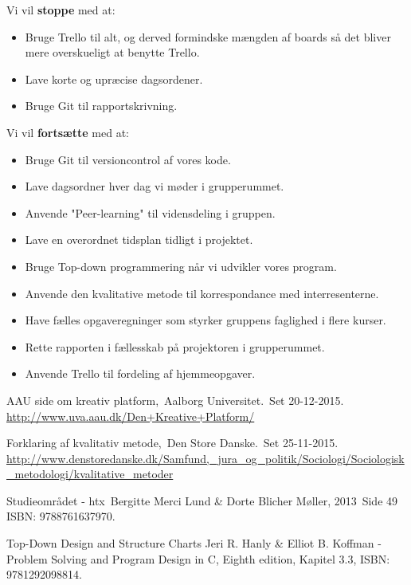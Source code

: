 \documentclass[oneside,a4paper,titlepage]{article}
\begin{document}
Vi vil \textbf{stoppe} med at:
\begin{itemize}
  \item Bruge Trello til alt, og derved formindske mængden af boards så det bliver mere overskueligt at benytte Trello.
  \item Lave korte og upræcise dagsordener.
  \item Bruge Git til rapportskrivning.
\end{itemize}

Vi vil \textbf{fortsætte} med at:
\begin{itemize}
  \item Bruge Git til versioncontrol af vores kode.
  \item Lave dagsordner hver dag vi møder i grupperummet.
  \item Anvende "Peer-learning" til vidensdeling i gruppen. 
  \item Lave en overordnet tidsplan tidligt i projektet. 
  \item Bruge Top-down programmering når vi udvikler vores program.
  \item Anvende den kvalitative metode til korrespondance med interresenterne. 
  \item Have fælles opgaveregninger som styrker gruppens faglighed i flere kurser.
  \item Rette rapporten i fællesskab på projektoren i grupperummet.
  \item Anvende Trello til fordeling af hjemmeopgaver.
\end{itemize}

\begin{thebibliography}{99}
  AAU side om kreativ platform,\
  Aalborg Universitet.\
  Set 20-12-2015.\\
  \url{http://www.uva.aau.dk/Den+Kreative+Platform/}

  Forklaring af kvalitativ metode,\
  Den Store Danske.\
  Set 25-11-2015.\\
  \url{http://www.denstoredanske.dk/Samfund,_jura_og_politik/Sociologi/Sociologisk_metodologi/kvalitative_metoder}

\bibitem{SO_bog}  
  Studieområdet - htx\
  Bergitte Merci Lund \& Dorte Blicher Møller, 2013\
  Side 49\\
  ISBN: 9788761637970.

  Top-Down Design and Structure Charts
  Jeri R. Hanly \& Elliot B. Koffman - Problem Solving and Program Design in C, Eighth edition, Kapitel 3.3,
  ISBN: 9781292098814.
  
\end{thebibliography}
\end{document}

